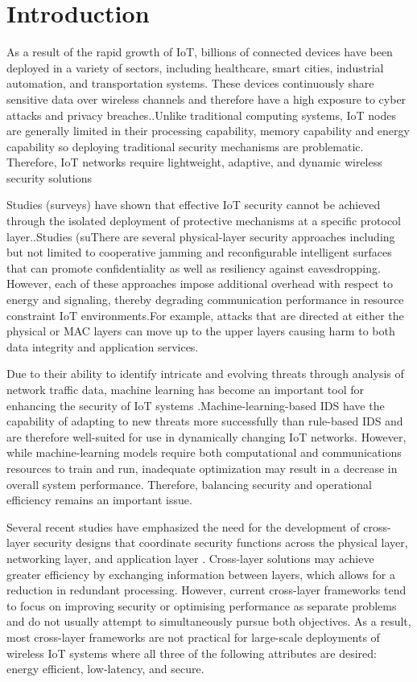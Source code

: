 \documentclass[a4paper,fleqn]{cas-dc}
\numberwithin{equation}{section}
\begin{document}
\section{Introduction}

As a result of the rapid growth of IoT, billions of connected devices have been deployed in a variety of sectors, including healthcare, smart cities, industrial automation, and transportation systems. These devices continuously share sensitive data over wireless channels and therefore have a high exposure to cyber attacks and privacy breaches.\cite{etman2025mlwsn}.Unlike traditional computing systems, IoT nodes are generally limited in their processing capability, memory capability and energy capability so deploying traditional security mechanisms are problematic. Therefore, IoT networks require lightweight, adaptive, and dynamic wireless security solutions

Studies (surveys) have shown that effective IoT security cannot be achieved through the isolated deployment of protective mechanisms at a specific protocol layer.\cite{kaur2024ris}.Studies (suThere are several physical-layer security approaches including but not limited to cooperative jamming and reconfigurable intelligent surfaces that can promote confidentiality as well as resiliency against eavesdropping\cite{martalo2024crosslayer}. However, each of these approaches impose additional overhead with respect to energy and signaling, thereby degrading communication performance in resource constraint IoT environments.For example, attacks that are directed at either the physical or MAC layers can move up to the upper layers causing harm to both data integrity and application services. 

Due to their ability to identify intricate and evolving threats through analysis of network traffic data, machine learning has become an important tool for enhancing the security of IoT systems \cite{mustafa2025ml}.Machine-learning-based IDS have the capability of adapting to new threats more successfully than rule-based IDS and are therefore well-suited for use in dynamically changing IoT networks. However, while machine-learning models require both computational and communications resources to train and run, inadequate optimization may result in a decrease in overall system performance. Therefore, balancing security and operational efficiency remains an important issue.

Several recent studies have emphasized the need for the development of cross-layer security designs that coordinate security functions across the physical layer, networking layer, and application layer \cite{cetintav2025auth}. Cross-layer solutions may achieve greater efficiency by exchanging information between layers, which allows for a reduction in redundant processing. However, current cross-layer frameworks tend to focus on improving security or optimising performance as separate problems and do not usually attempt to simultaneously pursue both objectives. As a result, most cross-layer frameworks are not practical for large-scale deployments of wireless IoT systems where all three of the following attributes are desired: energy efficient, low-latency, and secure.
\end{document}

